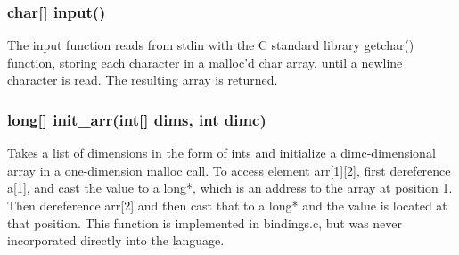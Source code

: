 \begin{homeworkProblem}
	\subsubsection{char[] input()}
	The input function reads from stdin with the C standard library getchar() function, storing each character in a malloc'd char array, until a newline character is read. The resulting array is returned.
	\subsubsection{long[] init\_arr(int[] dims, int dimc)}
	Takes a list of dimensions in the form of ints and initialize a dimc-dimensional array in a one-dimension malloc call. To access element arr[1][2], first dereference a[1], and cast the value to a long*, which is an address to the array at position 1. Then dereference arr[2] and then cast that to a long* and the value is located at that position. This function is implemented in bindings.c, but was never incorporated directly into the language. 
\end{homeworkProblem}
